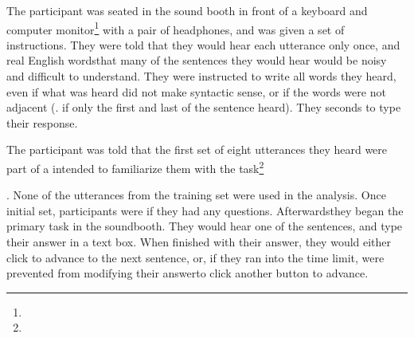 The participant was seated in the sound booth in front of a keyboard and computer monitor\DIFaddbegin \footnote{} \DIFaddend with a pair of headphones, and was given a set of instructions. They were told that they would hear each utterance only once, and \DIFdelbegin {}\DIFdelend \DIFaddbegin {}\DIFaddend real English words\DIFdelbegin {}\DIFdelend \DIFaddbegin {}\DIFaddend that many of the sentences they would hear would be noisy and difficult to understand. They were instructed to write all words they heard, even if what was heard did not make syntactic sense, or if the words were not adjacent (\DIFdelbegin {}\DIFdelend \DIFaddbegin {}\DIFaddend . if only the first and last \DIFdelbegin {}\DIFdelend \DIFaddbegin {}\DIFaddend of the sentence \DIFdelbegin {}\DIFdelend \DIFaddbegin {}\DIFaddend heard). They \DIFdelbegin {}\DIFdelend \DIFaddbegin {} seconds to type their response\DIFdelbegin {}\DIFdelend \DIFaddbegin {}\DIFaddend .

The participant was told that the first set of eight utterances they heard were part of a \DIFdelbegin {}\DIFdelend \DIFaddbegin {}\DIFaddend intended to familiarize them with the task\DIFdelbegin \footnote{}%
\addtocounter{footnote}{-1}%
\DIFdelend \DIFaddbegin {}\DIFaddend .  None of the utterances from the training set were used in the analysis.  Once \DIFdelbegin {}\DIFdelend \DIFaddbegin {}\DIFaddend initial set, participants were \DIFdelbegin {}\DIFdelend \DIFaddbegin {}\DIFaddend if they had any questions.  Afterwards\DIFaddbegin \DIFadd{, }\DIFaddend they began the primary task in the soundbooth.  They would hear one of the sentences, and type their answer in a text box.  When finished with their answer, they would either click to advance to the next sentence, or, if they ran into the time limit, \DIFaddbegin {}\DIFaddend were prevented from modifying their answer\DIFdelbegin {}\DIFdelend \DIFaddbegin {}\DIFaddend to click another button to advance\DIFdelbegin {}\DIFdelend \DIFaddbegin {}\DIFaddend .

